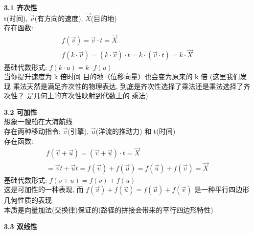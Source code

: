 \documentclass[12pt]{article}
\begin{document}
\begin{flushleft}
\begin{itemize}
              \vspace{0.3em}
              \textbf{3.1 齐次性} \\

              t(时间), $\vec{v}$(有方向的速度), $\vec{X}$(目的地) \\
              存在函数:\\
              \begin{align}
                  f(\vec{v}) = \vec{v} \cdot t = \vec{X} \\
                  f(k \cdot \vec{v}) = (k \cdot \vec{v}) \cdot t = k \cdot (\vec{v} \cdot t) = k \cdot \vec{X}
              \end{align}
              基础代数形式: $f(k \cdot u) = k \cdot f(u)$ \\
              当你提升速度为 k 倍时间 目的地（位移向量）也会变为原来的 k 倍
              (这里我们发现 乘法天然是满足齐次性的物理表达, 到底是齐次性选择了乘法还是乘法选择了齐次性？
              是几何上的齐次性映射到代数上的 乘法)

              \vspace{0.3em}
              \textbf{3.2 可加性} \\

              想象一艘船在大海航线 \\
              存在两种移动指令: $\vec{v}$(引擎), $\vec{u}$(洋流的推动力) 和 t(时间) \\
              存在函数:
              \begin{align}
                  f(\vec{v} + \vec{u}) = (\vec{v} + \vec{u}) \cdot t = \vec{X} \\
                  =\vec{v}t + \vec{u}t  = f(\vec{v}) + f(\vec{u}) =  f(\vec{u}) + f(\vec{v}) = \vec{X}
              \end{align}
              基础代数形式: $f(v + u) = f(v) + f(u)$ \\
              这是可加性的一种表现, 而 $f(\vec{v}) + f(\vec{u}) =  f(\vec{u}) + f(\vec{v})$ 是一种平行四边形几何性质的表现 \\
              本质是向量加法(交换律)保证的(路径的拼接会带来的平行四边形特性)

              \vspace{0.3em}
              \textbf{3.3 双线性} \\


\end{itemize}
\end{flushleft}
\end{document}
